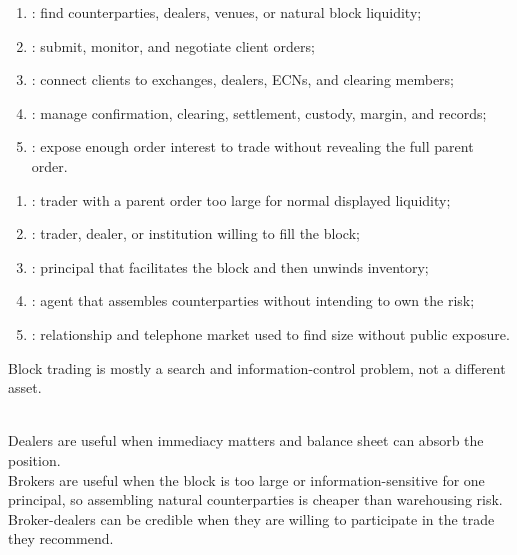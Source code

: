 \begin{taxonomy} 
\begin{enumerate}[label=\roman*.]
\setlength{\itemsep}{0pt}
\item {}: find counterparties, dealers, venues, or natural block liquidity;
\item {}: submit, monitor, and negotiate client orders;
\item {}: connect clients to exchanges, dealers, ECNs, and clearing members;
\item {}: manage confirmation, clearing, settlement, custody, margin, and records;
\item {}: expose enough order interest to trade without revealing the full parent order.
\end{enumerate}
\end{taxonomy}

\begin{taxonomy} 
\begin{enumerate}[label=\roman*.]
\setlength{\itemsep}{0pt}
\item {}: trader with a parent order too large for normal displayed liquidity;
\item {}: trader, dealer, or institution willing to fill the block;
\item {}: principal that facilitates the block and then unwinds inventory;
\item {}: agent that assembles counterparties without intending to own the risk;
\item {}: relationship and telephone market used to find size without public exposure.
\end{enumerate}
Block trading is mostly a search and information-control problem, not a different asset.
\end{taxonomy}

\begin{principle} \\
Dealers are useful when immediacy matters and balance sheet can absorb the position.\\
Brokers are useful when the block is too large or information-sensitive for one principal, so assembling natural counterparties is cheaper than warehousing risk.\\
Broker-dealers can be credible when they are willing to participate in the trade they recommend.
\end{principle}

